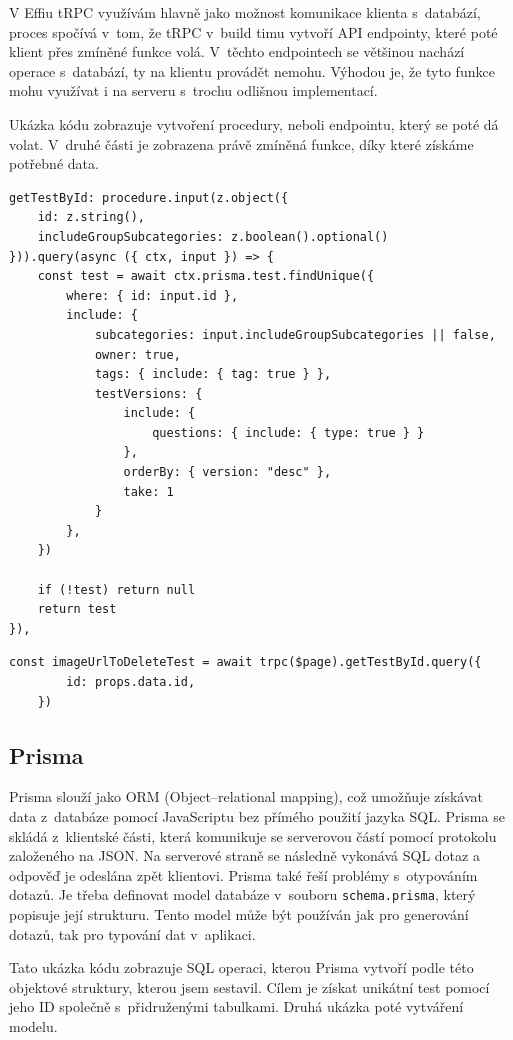 \documentclass[12pt, a4paper,
openright
]{report}
\begin{document}
V Effiu tRPC využívám hlavně jako možnost komunikace klienta s~databází, proces spočívá v~tom, že tRPC v~build timu vytvoří API endpointy, které poté klient přes zmíněné funkce volá. V~těchto endpointech se většinou nachází operace s~databází, ty na klientu provádět nemohu. Výhodou je, že tyto funkce mohu využívat i na serveru s~trochu odlišnou implementací.

Ukázka kódu zobrazuje vytvoření procedury, neboli endpointu, který se poté dá volat. V~druhé části je zobrazena právě zmíněná funkce, díky které získáme potřebné data.

\begin{lstlisting}[style=ES6, caption=Endpoint generovaný pomocí tRPC, label=trpc_code]
getTestById: procedure.input(z.object({
	id: z.string(),
	includeGroupSubcategories: z.boolean().optional()
})).query(async ({ ctx, input }) => {
	const test = await ctx.prisma.test.findUnique({
		where: { id: input.id },
		include: {
			subcategories: input.includeGroupSubcategories || false,
			owner: true,
			tags: {	include: { tag: true } },
			testVersions: {
				include: {
					questions: { include: { type: true } }
				},
				orderBy: { version: "desc" },
				take: 1
			}
		},
	})
	
	if (!test) return null
	return test
}),
\end{lstlisting}
\begin{lstlisting}[style=ES6, caption=Volání funkce pomocí tRPC klienta s metodou getTestById, label=trpc_code_use]
	const imageUrlToDeleteTest = await trpc($page).getTestById.query({
		id: props.data.id,
	})
\end{lstlisting}
\subsection{Prisma}
Prisma slouží jako ORM (Object–relational mapping), což umožňuje získávat data z~databáze pomocí JavaScriptu bez přímého použití jazyka SQL. Prisma se skládá z~klientské části, která komunikuje se serverovou částí pomocí protokolu založeného na JSON. Na serverové straně se následně vykonává SQL dotaz a odpověď je odeslána zpět klientovi. Prisma také řeší problémy s~otypováním dotazů. Je třeba definovat model databáze v~souboru \texttt{schema.prisma}, který popisuje její strukturu. Tento model může být používán jak pro generování dotazů, tak pro typování dat v~aplikaci.

Tato ukázka kódu zobrazuje SQL operaci, kterou Prisma vytvoří podle této objektové struktury, kterou jsem sestavil. Cílem je získat unikátní test pomocí jeho ID společně s~přidruženými tabulkami. Druhá ukázka poté vytváření modelu.
\end{document}
